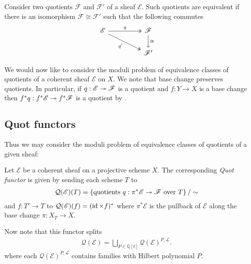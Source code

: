 \documentclass[12pt]{ociamthesis}  %
\begin{document}
Consider two quotients $\mathscr F$ and $\mathscr F'$ of a
sheaf $\mathscr E$.
Such quotients are equivalent if there is an isomorphism
$\mathscr F\cong\mathscr F'$ such that the following commutes
\begin{equation}\label{eq:quotient_equivalence}
  \begin{tikzcd}
    {\mathscr E} && {\mathscr F} \\
    && {\mathscr F'}
    \arrow["q", two heads, from=1-1, to=1-3]
    \arrow["{q'}"', two heads, from=1-1, to=2-3]
    \arrow["\cong", from=1-3, to=2-3]
  \end{tikzcd}
\end{equation}

We would now like to consider the moduli problem of equivalence
classes of quotients of a coherent sheaf $\mathscr E$ on $X$.
We note that base change preserves quotients. In particular,
if $q : \mathscr E \twoheadrightarrow \mathscr F$ is a quotient and
$f : Y \to X$ is a base change then
$f^*q : f^*\mathscr E \twoheadrightarrow f^*\mathscr F$ is a quotient
by \cite[\href{https://stacks.math.columbia.edu/tag/01U9}{Tag 01U9}]{stacks-project}.

\subsection{Quot functors}

Thus we may consider the moduli problem of equivalence classes of
quotients of a given sheaf:

\begin{definition}\missingcitation
  Let $\mathscr E$ be a coherent sheaf on a projective scheme $X$.
  The corresponding \emph{Quot functor} is given by sending each
  scheme $T$ to
  \begin{align*}
    \mathcal Q(\mathscr E)(T) = \left\lbrace{
      \text{quotients $q : \pi^*\mathscr E \twoheadrightarrow \mathscr F$
        over $T$}
    }\right\rbrace / \sim
  \end{align*}
  and $f : T' \to T$ to
  $\mathcal Q(\mathscr E)(f) = (\operatorname{id} \times f)^*$ where
  $\pi^*\mathscr E$ is the pullback of $\mathscr E$ along
  the base change $\pi:X_T\to X$.
\end{definition}

Now note that this functor splits
\begin{align*}
  \mathcal Q(\mathscr E)
  = \bigsqcup_{P\in\mathbb{Q}[t]} \mathcal Q(\mathscr E)^{P,\mathscr L}.
\end{align*}
where each $\mathcal Q(\mathscr E)^{P,\mathscr L}$ contains families
with Hilbert polynomial $P$.
\end{document}
